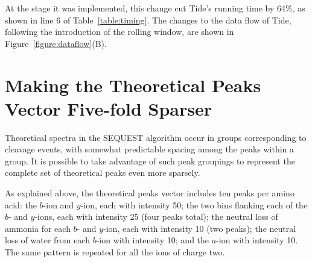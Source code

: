 At the stage it was implemented, this change cut Tide's running time
by 64\%, as shown in line 6 of Table~\ref{table:timing}. The changes
to the data flow of Tide, following the introduction of the rolling
window, are shown in Figure~\ref{figure:dataflow}(B).

\section{
  Making the Theoretical Peaks Vector Five-fold Sparser
  \label{subsubsection:fivefold}
}

Theoretical spectra in the SEQUEST algorithm occur in groups
corresponding to cleavage events, with somewhat predictable spacing
among the peaks within a group. It is possible to take advantage of
such peak groupings to represent the complete set of theoretical peaks
even more sparsely.

As explained above, the theoretical peaks vector includes ten peaks
per amino acid: the $b$-ion and $y$-ion, each with intensity 50; the
two bins flanking each of the $b$- and $y$-ions, each with intensity
25 (four peaks total); the neutral loss of ammonia for each $b$- and
$y$-ion, each with intensity 10 (two peaks); the neutral loss of water
from each $b$-ion with intensity 10; and the $a$-ion with intensity
10. The same pattern is repeated for all the ions of charge two.

